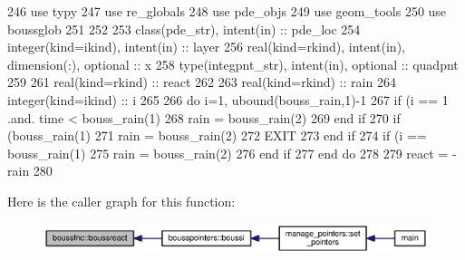 \begin{DoxyCode}
246         \textcolor{keywordtype}{use }typy
247         \textcolor{keywordtype}{use }re_globals
248         \textcolor{keywordtype}{use }pde_objs
249         \textcolor{keywordtype}{use }geom_tools
250         \textcolor{keywordtype}{use }boussglob
251 
252 
253         \textcolor{keywordtype}{class}(pde_str), \textcolor{keywordtype}{intent(in)} :: pde\_loc 
254         \textcolor{keywordtype}{integer(kind=ikind)}, \textcolor{keywordtype}{intent(in)} :: layer
256         \textcolor{keywordtype}{real(kind=rkind)}, \textcolor{keywordtype}{intent(in)}, \textcolor{keywordtype}{dimension(:)},  \textcolor{keywordtype}{optional} :: x
258         \textcolor{keywordtype}{type}(integpnt_str), \textcolor{keywordtype}{intent(in)}, \textcolor{keywordtype}{optional} :: quadpnt
259 
261         \textcolor{keywordtype}{real(kind=rkind)} :: react
262         
263         \textcolor{keywordtype}{real(kind=rkind)} :: rain
264         \textcolor{keywordtype}{integer(kind=ikind)} :: i
265         
266         \textcolor{keywordflow}{do} i=1, ubound(bouss_rain,1)-1
267           \textcolor{keywordflow}{if} (i == 1 .and. time < bouss_rain(1)%
268             rain = bouss_rain(2)%
269 \textcolor{keywordflow}{          end if}
270           \textcolor{keywordflow}{if} (bouss_rain(1)%
271             rain = bouss_rain(2)%
272             \textcolor{keywordflow}{EXIT}
273 \textcolor{keywordflow}{          end if}
274           \textcolor{keywordflow}{if} (i == bouss_rain(1)%
275             rain = bouss_rain(2)%
276 \textcolor{keywordflow}{          end if}
277 \textcolor{keywordflow}{        end do}  
278         
279         react = -rain
280          
\end{DoxyCode}


Here is the caller graph for this function\+:\nopagebreak
\begin{figure}[H]
\begin{center}
\leavevmode
\includegraphics[width=350pt]{namespaceboussfnc_aa942b39df59c308dadcfa69b1256ed09_icgraph}
\end{center}
\end{figure}


